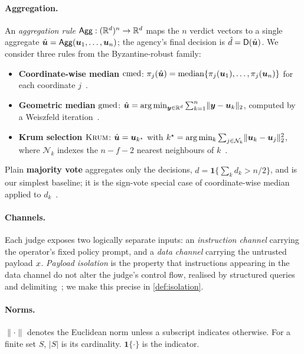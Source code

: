 \paragraph{Aggregation.}
An \emph{aggregation rule} $\mathsf{Agg}:(\mathbb{R}^{d})^{n}\to\mathbb{R}^{d}$ maps the $n$ verdict vectors to a
single aggregate $\hat{\bm{u}}=\mathsf{Agg}(\bm{u}_1,\dots,\bm{u}_n)$; the agency's final decision is
$\hat d=\mathsf{D}(\hat{\bm{u}})$. We consider three rules from the Byzantine-robust family:
\begin{itemize}[leftmargin=1.4em,itemsep=1pt,topsep=2pt]
  \item \textbf{Coordinate-wise median} $\operatorname{cmed}$: $\pi_j(\hat{\bm{u}})=\operatorname{median}
        \{\pi_j(\bm{u}_1),\dots,\pi_j(\bm{u}_n)\}$ for each coordinate $j$~\cite{yin2018byzantine}.
  \item \textbf{Geometric median} $\operatorname{gmed}$: $\hat{\bm{u}}=\arg\min_{\bm y\in\mathbb{R}^d}\sum_{k=1}^n
        \lVert \bm y-\bm{u}_k\rVert_2$, computed by a Weiszfeld
        iteration~\cite{chen2017byzantine,pillutla2022rfa}.
  \item \textbf{Krum selection} $\textsc{Krum}$: $\hat{\bm{u}}=\bm{u}_{k^\star}$ with
        $k^\star=\arg\min_k \sum_{j\in \mathcal N_k}\lVert \bm{u}_k-\bm{u}_j\rVert_2^2$,
        where $\mathcal N_k$ indexes the $n-f-2$ nearest neighbours of
        $k$~\cite{blanchard2017krum}.
\end{itemize}
Plain \textbf{majority vote} aggregates only the decisions,
$\hat d=\mathbf 1\{\sum_k d_k>n/2\}$, and is our simplest baseline; it is the sign-vote
special case of coordinate-wise median applied to $d_k$~\cite{bernstein2019signsgd}.

\paragraph{Channels.}
Each judge exposes two logically separate inputs: an \emph{instruction channel} carrying
the operator's fixed policy prompt, and a \emph{data channel} carrying the untrusted
payload $x$. \emph{Payload isolation} is the property that instructions appearing in
the data channel do not alter the judge's control flow, realised by structured queries
and delimiting~\cite{chen2024struq,hines2024spotlighting}; we make this precise in
\cref{def:isolation}.

\paragraph{Norms.}
$\lVert\cdot\rVert$ denotes the Euclidean norm unless a subscript indicates otherwise.
For a finite set $S$, $|S|$ is its cardinality. $\mathbf 1\{\cdot\}$ is the indicator.

